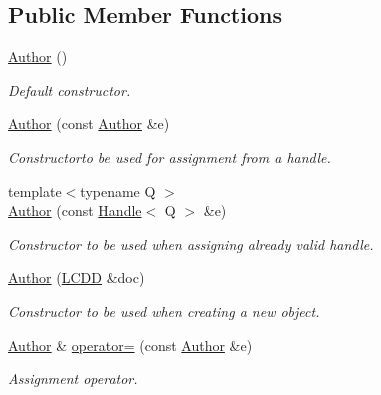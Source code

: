 \subsection*{Public Member Functions}
\begin{DoxyCompactItemize}
\item 
\hyperlink{class_d_d4hep_1_1_geometry_1_1_author_a2803ac1dacb60ce706d59c4e1378f93c}{Author} ()
\begin{DoxyCompactList}\small\item\em Default constructor. \item\end{DoxyCompactList}\item 
\hyperlink{class_d_d4hep_1_1_geometry_1_1_author_a9f58da7da25568979eac0c706e6f9d88}{Author} (const \hyperlink{class_d_d4hep_1_1_geometry_1_1_author}{Author} \&e)
\begin{DoxyCompactList}\small\item\em Constructorto be used for assignment from a handle. \item\end{DoxyCompactList}\item 
{\footnotesize template$<$typename Q $>$ }\\\hyperlink{class_d_d4hep_1_1_geometry_1_1_author_aab9fc589f8d76f790361021042b9e8c8}{Author} (const \hyperlink{class_d_d4hep_1_1_handle}{Handle}$<$ Q $>$ \&e)
\begin{DoxyCompactList}\small\item\em Constructor to be used when assigning already valid handle. \item\end{DoxyCompactList}\item 
\hyperlink{class_d_d4hep_1_1_geometry_1_1_author_a9b8aae7585fe19fce420630f7fdd0d55}{Author} (\hyperlink{class_d_d4hep_1_1_geometry_1_1_l_c_d_d}{LCDD} \&doc)
\begin{DoxyCompactList}\small\item\em Constructor to be used when creating a new object. \item\end{DoxyCompactList}\item 
\hyperlink{class_d_d4hep_1_1_geometry_1_1_author}{Author} \& \hyperlink{class_d_d4hep_1_1_geometry_1_1_author_a59a753444504866fdb2c4e798823cd17}{operator=} (const \hyperlink{class_d_d4hep_1_1_geometry_1_1_author}{Author} \&e)
\begin{DoxyCompactList}\small\item\em Assignment operator. \item\end{DoxyCompactList}\item 

\end{DoxyCompactItemize}

